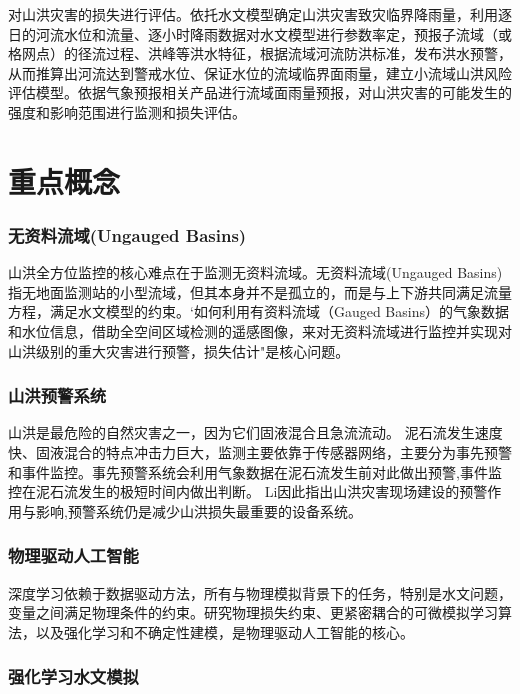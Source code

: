 \documentclass{ctexart}
\begin{document}
对山洪灾害的损失进行评估。依托水文模型确定山洪灾害致灾临界降雨量，利用逐日的河流水位和流量、逐小时降雨数据对水文模型进行参数率定，预报子流域（或格网点）的径流过程、洪峰等洪水特征，根据流域河流防洪标准，发布洪水预警，从而推算出河流达到警戒水位、保证水位的流域临界面雨量，建立小流域山洪风险评估模型。依据气象预报相关产品进行流域面雨量预报，对山洪灾害的可能发生的强度和影响范围进行监测和损失评估。

\section{重点概念}



\subsubsection{无资料流域(Ungauged Basins)}

山洪全方位监控的核心难点在于监测无资料流域。无资料流域(Ungauged Basins)指无地面监测站的小型流域，但其本身并不是孤立的，而是与上下游共同满足流量方程，满足水文模型的约束。`如何利用有资料流域（Gauged Basins）的气象数据和水位信息，借助全空间区域检测的遥感图像，来对无资料流域进行监控并实现对山洪级别的重大灾害进行预警，损失估计"是核心问题。

\subsubsection{山洪预警系统}

山洪\cite{koutalakis2020using}是最危险的自然灾害之一，因为它们固液混合且急流流动。
泥石流发生速度快、固液混合的特点冲击力巨大，监测主要依靠于传感器网络，主要分为事先预警和事件监控。事先预警系统会利用气象数据在泥石流发生前对此做出预警,事件监控在泥石流发生的极短时间内做出判断\cite{arattano2008systems}。
Li因此指出\cite{li2012flash}山洪灾害现场建设的预警作用与影响,预警系统仍是减少山洪损失最重要的设备系统。

\subsubsection{物理驱动人工智能}

深度学习依赖于数据驱动方法，所有与物理模拟背景下的任务，特别是水文问题，变量之间满足物理条件的约束。研究物理损失约束、更紧密耦合的可微模拟学习算法，以及强化学习和不确定性建模，是物理驱动人工智能的核心。

\subsubsection{强化学习水文模拟}
\end{document}
